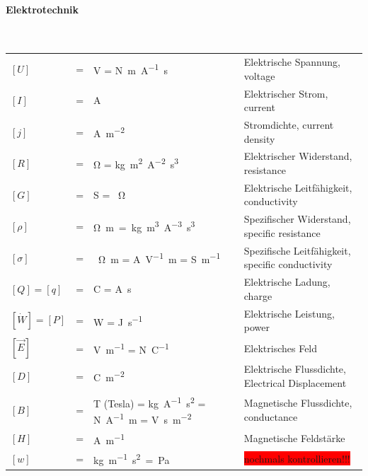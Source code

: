 \documentclass[a4paper, 10pt]{scrartcl}
\begin{document}
	\paragraph{Elektrotechnik}~\\
	\begin{tabularx}{\linewidth}{lclX}
		$[U]$ &=& \si{\volt} = \si{\newton\meter\per\ampere\second} & Elektrische Spannung, voltage \\
		$[I]$ &=& \si{\ampere} & Elektrischer Strom, current \\
		$[j]$ &=& \si{\ampere\per\square\meter} & Stromdichte, current density \\
		$[R]$ &=& \si{\ohm} = \si{\kilogram\square\meter\per\square\ampere\second\tothe{3}} & Elektrischer Widerstand, resistance \\
		$[G]$ &=& \si{\siemens} = \si{\per\ohm} & Elektrische Leitfähigkeit, conductivity \\
		$[\rho]$ &=& \si{\ohm\meter = \kilogram \meter\cubed \per\ampere\tothe{3}\second\tothe{3}} & Spezifischer Widerstand, specific resistance \\
		$[\sigma]$ &=& \si{\per\ohm\meter} = \si{\ampere\per\volt\meter} = \si{\siemens\per\meter} & Spezifische Leitfähigkeit, specific conductivity \\
		
		
		
		$[Q]=[q]$ &=& \si{\coulomb} = \si{\ampere\second} & Elektrische Ladung, charge \\
		$[\dot W]=[P]$ &=& \si{\watt} = \si{\joule\per\second} & Elektrische Leistung, power \\
		$[\vec{E}]$ &=& \si{\volt\per\meter} = \si{\newton\per\coulomb} & Elektrisches Feld \\
		$[D]$ &=& \si{\coulomb\per\square\meter} & Elektrische Flussdichte, Electrical Displacement \\
		
		$[B]$ &=& \si{\tesla} (Tesla) = \si{\kilogram\per\ampere\square\second} = \si{\newton\per\ampere\meter} = \si{\volt\second\per\square\meter} & Magnetische Flussdichte, conductance \\
		$[H]$ &=& \si{\ampere\per\meter} & Magnetische Feldstärke \\
		
		$[w]$ &=& \si{\kilogram\per\meter\square\second=\pascal} & \colorbox{red}{nochmals kontrollieren!!!} \\
		

\end{tabularx}
\end{document}
